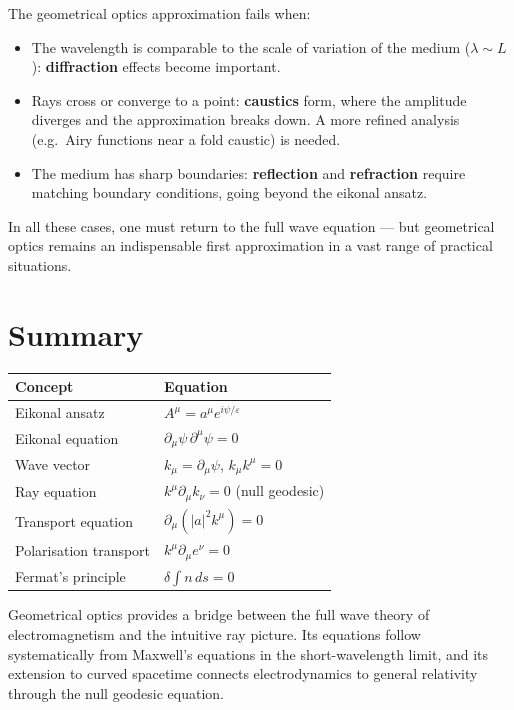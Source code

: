 The geometrical optics approximation fails when:

\begin{itemize}
\item The wavelength is comparable to the scale of variation of the medium ($\lambda \sim L$): \textbf{diffraction} effects become important.
\item Rays cross or converge to a point: \textbf{caustics} form, where the amplitude diverges and the approximation breaks down. A more refined analysis (e.g.\ Airy functions near a fold caustic) is needed.
\item The medium has sharp boundaries: \textbf{reflection} and \textbf{refraction} require matching boundary conditions, going beyond the eikonal ansatz.
\end{itemize}

In all these cases, one must return to the full wave equation --- but geometrical optics remains an indispensable first approximation in a vast range of practical situations.

\section{Summary}

\begin{table}[h]
\centering
\renewcommand{\arraystretch}{1.5}
\begin{tabular}{ll}
\toprule
\textbf{Concept} & \textbf{Equation} \\
\midrule
Eikonal ansatz & $A^\mu = a^\mu e^{i\psi/\varepsilon}$ \\
Eikonal equation & $\partial_\mu\psi\,\partial^\mu\psi = 0$ \\
Wave vector & $k_\mu = \partial_\mu\psi$,\; $k_\mu k^\mu = 0$ \\
Ray equation & $k^\mu\partial_\mu k_\nu = 0$ (null geodesic) \\
Transport equation & $\partial_\mu(|a|^2 k^\mu) = 0$ \\
Polarisation transport & $k^\mu\partial_\mu e^\nu = 0$ \\
Fermat's principle & $\delta\int n\,ds = 0$ \\
\bottomrule
\end{tabular}
\end{table}

Geometrical optics provides a bridge between the full wave theory of electromagnetism and the intuitive ray picture. Its equations follow systematically from Maxwell's equations in the short-wavelength limit, and its extension to curved spacetime connects electrodynamics to general relativity through the null geodesic equation.
